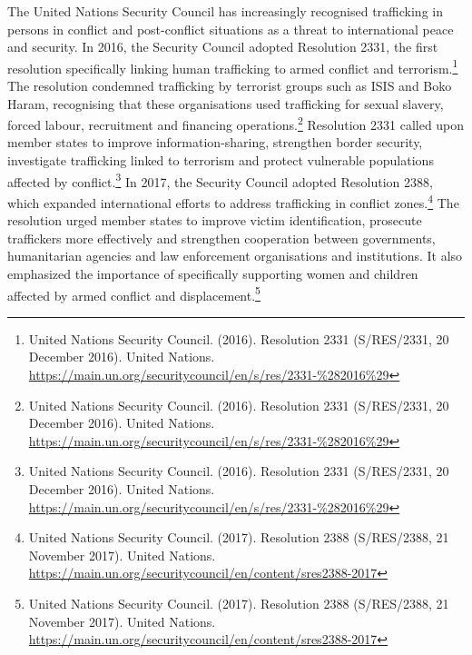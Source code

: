 The United Nations Security Council has increasingly recognised trafficking in persons in conflict and post-conflict situations as a threat to international peace and security. In 2016, the Security Council adopted Resolution 2331, the first resolution specifically linking human trafficking to armed conflict and terrorism.\footnote{United Nations Security Council. (2016). Resolution 2331 (S/RES/2331, 20 December 2016). United Nations. \url{https://main.un.org/securitycouncil/en/s/res/2331-\%282016\%29}} The resolution condemned trafficking by terrorist groups such as ISIS and Boko Haram, recognising that these organisations used trafficking for sexual slavery, forced labour, recruitment and financing operations.\footnote{United Nations Security Council. (2016). Resolution 2331 (S/RES/2331, 20 December 2016). United Nations. \url{https://main.un.org/securitycouncil/en/s/res/2331-\%282016\%29}} Resolution 2331 called upon member states to improve information-sharing, strengthen border security, investigate trafficking linked to terrorism and protect vulnerable populations affected by conflict.\footnote{United Nations Security Council. (2016). Resolution 2331 (S/RES/2331, 20 December 2016). United Nations. \url{https://main.un.org/securitycouncil/en/s/res/2331-\%282016\%29}} In 2017, the Security Council adopted Resolution 2388, which expanded international efforts to address trafficking in conflict zones.\footnote{United Nations Security Council. (2017). Resolution 2388 (S/RES/2388, 21 November 2017). United Nations. \url{https://main.un.org/securitycouncil/en/content/sres2388-2017}} The resolution urged member states to improve victim identification, prosecute traffickers more effectively and strengthen cooperation between governments, humanitarian agencies and law enforcement organisations and institutions. It also emphasized the importance of specifically supporting women and children affected by armed conflict and displacement.\footnote{United Nations Security Council. (2017). Resolution 2388 (S/RES/2388, 21 November 2017). United Nations. \url{https://main.un.org/securitycouncil/en/content/sres2388-2017}}

